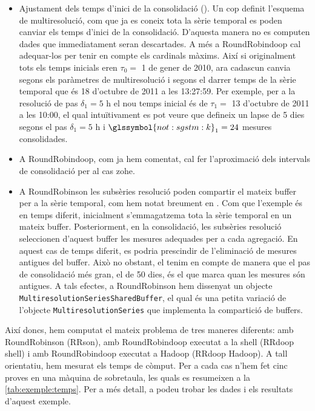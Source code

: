 \begin{itemize}
\item Ajustament dels temps d'inici de la consolidació
  (). Un cop definit l'esquema
  de multiresolució, com que ja es coneix tota la sèrie temporal es
  poden canviar els temps d'inici de la consolidació. D'aquesta manera
  no es computen dades que immediatament seran descartades. A més a
  RoundRobindoop cal adequar-los per tenir en compte els cardinals
  màxims. Així si originalment tots els temps inicials eren $\tau_0=$
  1 de gener de 2010, ara cadascun canvia segons els paràmetres de
  multiresolució i segons el darrer temps de la sèrie temporal que és
  18 d'octubre de 2011 a les 13:27:59. Per exemple, per a la resolució
  de pas $\delta_1=5 \text{ h}$ el nou temps inicial és de $\tau_1=$
  13 d'octubre de 2011 a les 10:00, el qual intuïtivament es pot veure
  que defineix un lapse de 5 dies segons el pas $\delta_1=5 \text{ h}$
  i $\glssymbol{not:sgstm:k}_1=24$ mesures consolidades.


\item A RoundRobindoop, com ja hem comentat, cal fer l'aproximació
  dels intervals de consolidació per al cas \gls{zohe}.


\item A RoundRobinson les subsèries resolució poden compartir el
  mateix buffer per a la sèrie temporal, com hem notat breument en
  . Com que l'exemple és
  en temps diferit, inicialment s'emmagatzema tota la sèrie temporal
  en un mateix buffer. Posteriorment, en la consolidació, les
  subsèries resolució seleccionen d'aquest buffer les mesures
  adequades per a cada agregació. En aquest cas de temps diferit, es
  podria prescindir de l'eliminació de mesures antigues del
  buffer. Això no obstant, el tenim en compte de manera que el pas de
  consolidació més gran, el de 50 dies, és el que marca quan les
  mesures són antigues. A tals efectes, a RoundRobinson hem dissenyat
  un objecte \lstinline[style=py]+MultiresolutionSeriesSharedBuffer+,
  el qual és una petita variació de l'objecte
  \lstinline[style=py]+MultiresolutionSeries+ que implementa la
  compartició de buffers.

\end{itemize}




Així doncs, hem computat el mateix problema de tres maneres diferents:
amb RoundRobinson (RRson), amb RoundRobindoop executat a la shell
(RRdoop shell) i amb RoundRobindoop executat a Hadoop (RRdoop
Hadoop). A tall orientatiu, hem mesurat els temps de còmput. Per a cada
cas n'hem fet cinc proves en una màquina de sobretaula, les
quals es resumeixen a la \autoref{tab:exemple:temps}. 
%
Per a més detall, a
 \cite[\url{http://escriny.epsem.upc.edu/svn/rrb/src/experiments/tags/isense-2014-tesi/}{experiments/tags/isense-2014-tesi/}]{llusa:implementacions}
podeu trobar les dades i els resultats d'aquest exemple.


